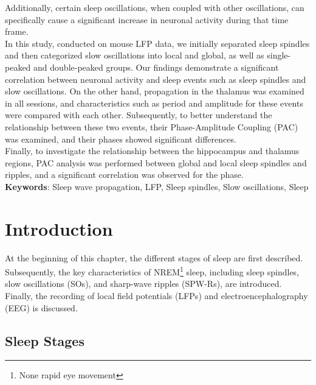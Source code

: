 \documentclass[12pt]{report}
\begin{document}
	Additionally, certain sleep oscillations, when coupled with other oscillations, can specifically cause a significant increase in neuronal activity during that time frame.\\[0.01cm]
	
	In this study, conducted on mouse LFP data, we initially separated sleep spindles and then categorized slow oscillations into local and global, as well as single-peaked and double-peaked groups. Our findings demonstrate a significant correlation between neuronal activity and sleep events such as sleep spindles and slow oscillations. On the other hand, propagation in the thalamus was examined in all sessions, and characteristics such as period and amplitude for these events were compared with each other. Subsequently, to better understand the relationship between these two events, their Phase-Amplitude Coupling (PAC) was examined, and their phases showed significant differences.\\ [0.01cm]
	
	Finally, to investigate the relationship between the hippocampus and thalamus regions, PAC analysis was performed between global and local sleep spindles and ripples, and a significant correlation was observed for the phase.\\[0.01cm]
	
	\textbf{Keywords}: Sleep wave propagation, LFP, Sleep spindles, Slow oscillations, Sleep
	\newpage
	
	
	\setcounter{tocdepth}{3}
	\tableofcontents
	\newpage
	
	\listoffigures
	\newpage
	
	
	\chapter{Introduction}
	\label{Introduction}
	At the beginning of this chapter, the different stages of sleep are first described. Subsequently, the key characteristics of NREM\footnote{None rapid eye movement} sleep, including sleep spindles, slow oscillations (SOs), and sharp-wave ripples (SPW-Rs), are introduced. Finally, the recording of local field potentials (LFPs) and electroencephalography (EEG) is discussed.
	
	\section{Sleep Stages}
	\label{sec:sleep-stages}
	
\end{document}
